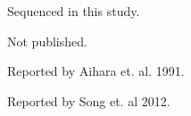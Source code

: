 \documentclass{report}
\begin{document}
\begin{table}[h]
	\centering
	\begin{ThreePartTable}

	\caption{Amino acid substitutions in SA14-14-2 vaccine strains, in reference to the newly-sequenced,
		wild-type SA14 strain.}

	\label{my-label}
	
	\begin{tablenotes}
	\item[a] Sequenced in this study.	
	\item[b] Not published.
	\item[c] Reported by Aihara et. al.  1991.
	\item[d] Reported by Song et. al 2012.
	\end{tablenotes}
	\end{ThreePartTable}
\end{table}
\end{document}
